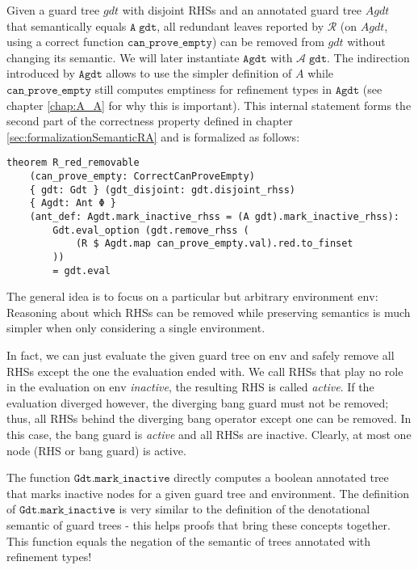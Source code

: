 Given a guard tree $gdt$ with disjoint RHSs
and an annotated guard tree $Agdt$ that semantically equals $\mathtt{A}\;\mathtt{gdt}$,
all redundant leaves reported by $\mathcal{R}$ (on $Agdt$, using a correct function $\mathtt{can\_prove\_empty}$) can be removed from $gdt$ without changing its semantic.
We will later instantiate $\mathtt{Agdt}$ with $\mathcal{A}\;\mathtt{gdt}$.
The indirection introduced by $\mathtt{Agdt}$ allows to use the simpler definition of $A$ while $\mathtt{can\_prove\_empty}$ still computes emptiness for refinement types in $\mathtt{Agdt}$ (see chapter \ref{chap:A_A} for why this is important).
This internal statement forms the second part of the correctness property defined in chapter \ref{sec:formalizationSemanticRA} and is formalized as follows:

\begin{verbatim}
theorem R_red_removable
    (can_prove_empty: CorrectCanProveEmpty)
    { gdt: Gdt } (gdt_disjoint: gdt.disjoint_rhss)
    { Agdt: Ant Φ }
    (ant_def: Agdt.mark_inactive_rhss = (A gdt).mark_inactive_rhss):
        Gdt.eval_option (gdt.remove_rhss (
            (R $ Agdt.map can_prove_empty.val).red.to_finset
        ))
        = gdt.eval
\end{verbatim}

The general idea is to focus on a particular but arbitrary environment $\mathrm{env}$:
Reasoning about which RHSs can be removed while preserving semantics is much simpler when only considering a single environment.

In fact, we can just evaluate the given guard tree on $\mathrm{env}$ and safely remove all RHSs except the one the evaluation ended with.
We call RHSs that play no role in the evaluation on $\mathrm{env}$ \textit{inactive}, the resulting RHS is called \textit{active}.
If the evaluation diverged however, the diverging bang guard must not be removed; thus, all RHSs behind the diverging bang operator except one can be removed. In this case, the bang guard is \textit{active} and all RHSs are inactive. Clearly, at most one node (RHS or bang guard) is active.

The function $\mathtt{Gdt.mark\_inactive}$ directly computes a boolean annotated tree
that marks inactive nodes for a given guard tree and environment.
The definition of $\mathtt{Gdt.mark\_inactive}$ is very similar to the definition of the denotational semantic of guard trees - this helps proofs that bring these concepts together.
This function equals the negation of the semantic of trees annotated with refinement types!

